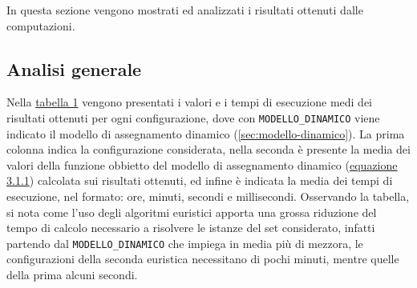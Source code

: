 In questa sezione vengono mostrati ed analizzati i risultati ottenuti dalle computazioni.

\subsection{Analisi generale}

Nella \hyperref[tab:medie-iniziali]{tabella 1} vengono presentati i valori e i tempi di esecuzione medi dei risultati ottenuti per ogni configurazione, dove con \texttt{MODELLO\_DINAMICO} viene indicato il modello di assegnamento dinamico (\autoref{sec:modello-dinamico}). La prima colonna indica la configurazione considerata, nella seconda è presente la media dei valori della funzione obbietto del modello di assegnamento dinamico (\hyperref[eq:dinamico-obj]{equazione 3.1.1}) calcolata sui risultati ottenuti, ed infine è indicata la media dei tempi di esecuzione, nel formato: ore, minuti, secondi e millisecondi. Osservando la tabella, si nota come l'uso degli algoritmi euristici apporta una grossa riduzione del tempo di calcolo necessario a risolvere le istanze del set considerato, infatti partendo dal \texttt{MODELLO\_DINAMICO} che impiega in media più di mezzora, le configurazioni della seconda euristica necessitano di pochi minuti, mentre quelle della prima alcuni secondi.

